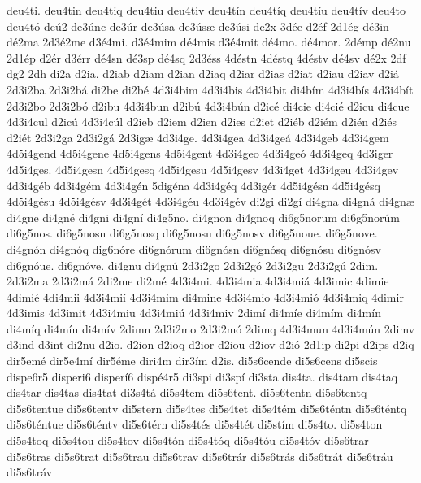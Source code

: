 {deu4ti.
deu4tin
deu4tiq
deu4tiu
deu4tiv
deu4t^^edn
deu4t^^edq
deu4t^^edu
deu4t^^edv
deu4to
deu4t^^f3
de^^fa2
de3^^fanc
de3^^far
de3^^fasa
de3^^fas^^e6
de3^^fasi
de2x
3d^^e9e
d2^^e9f
2d1^^e9g
d^^e93in
d^^e92ma
2d3^^e92me
d3^^e94mi.
d3^^e94mim
d^^e94mis
d3^^e94mit
d^^e94mo.
d^^e94mor.
2d^^e9mp
d^^e92nu
2d1^^e9p
d2^^e9r
d3^^e9rr
d^^e94sn
d^^e93sp
d^^e94sq
2d3^^e9ss
4d^^e9stn
4d^^e9stq
4d^^e9stv
d^^e94sv
d^^e92x
2df
dg2
2dh
di2a
d2ia.
d2iab
d2iam
d2ian
d2iaq
d2iar
d2ias
d2iat
d2iau
d2iav
d2i^^e1
2d3i2ba
2d3i2b^^e1
di2be
di2b^^e9
4d3i4bim
4d3i4bis
4d3i4bit
di4b^^edm
4d3i4b^^eds
4d3i4b^^edt
2d3i2bo
2d3i2b^^f3
d2ibu
4d3i4bun
d2ib^^fa
4d3i4b^^fan
d2ic^^e9
di4cie
di4ci^^e9
d2icu
di4cue
4d3i4cul
d2ic^^fa
4d3i4c^^fal
d2ieb
d2iem
d2ien
d2ies
d2iet
d2i^^e9b
d2i^^e9m
d2i^^e9n
d2i^^e9s
d2i^^e9t
2d3i2ga
2d3i2g^^e1
2d3ig^^e6
4d3i4ge.
4d3i4gea
4d3i4ge^^e1
4d3i4geb
4d3i4gem
4d5i4gend
4d5i4gene
4d5i4gens
4d5i4gent
4d3i4geo
4d3i4ge^^f3
4d3i4geq
4d3iger
4d5i4ges.
4d5i4gesn
4d5i4gesq
4d5i4gesu
4d5i4gesv
4d3i4get
4d3i4geu
4d3i4gev
4d3i4g^^e9b
4d3i4g^^e9m
4d3i4g^^e9n
5dig^^e9na
4d3i4g^^e9q
4d3ig^^e9r
4d5i4g^^e9sn
4d5i4g^^e9sq
4d5i4g^^e9su
4d5i4g^^e9sv
4d3i4g^^e9t
4d3i4g^^e9u
4d3i4g^^e9v
di2gi
di2g^^ed
di4gna
di4gn^^e1
di4gn^^e6
di4gne
di4gn^^e9
di4gni
di4gn^^ed
di4g5no.
di4gnon
di4gnoq
di6g5norum
di6g5nor^^fam
di6g5nos.
di6g5nosn
di6g5nosq
di6g5nosu
di6g5nosv
di6g5noue.
di6g5nove.
di4gn^^f3n
di4gn^^f3q
dig6n^^f3re
di6gn^^f3rum
di6gn^^f3sn
di6gn^^f3sq
di6gn^^f3su
di6gn^^f3sv
di6gn^^f3ue.
di6gn^^f3ve.
di4gnu
di4gn^^fa
2d3i2go
2d3i2g^^f3
2d3i2gu
2d3i2g^^fa
2dim.
2d3i2ma
2d3i2m^^e1
2di2me
di2m^^e9
4d3i4mi.
4d3i4mia
4d3i4mi^^e1
4d3imic
4dimie
4dimi^^e9
4di4mii
4d3i4mi^^ed
4d3i4mim
di4mine
4d3i4mio
4d3i4mi^^f3
4d3i4miq
4dimir
4d3imis
4d3imit
4d3i4miu
4d3i4mi^^fa
4d3i4miv
2dim^^ed
di4m^^ede
di4m^^edm
di4m^^edn
di4m^^edq
di4m^^edu
di4m^^edv
2dimn
2d3i2mo
2d3i2m^^f3
2dimq
4d3i4mun
4d3i4m^^fan
2dimv
d3ind
d3int
di2nu
d2io.
d2ion
d2ioq
d2ior
d2iou
d2iov
d2i^^f3
2d1ip
di2pi
d2ips
d2iq
dir5em^^e9
dir5e4m^^ed
dir5^^e9me
diri4m
dir3^^edm
d2is.
di5s6cende
di5s6cens
di5scis
dispe6r5
disperi6
disper^^ed6
disp^^e94r5
di3spi
di3sp^^ed
di3sta
dis4ta.
dis4tam
dis4taq
dis4tar
dis4tas
dis4tat
di3s4t^^e1
di5s4tem
di5s6tent.
di5s6tentn
di5s6tentq
di5s6tentue
di5s6tentv
di5stern
di5s4tes
di5s4tet
di5s4t^^e9m
di5s6t^^e9ntn
di5s6t^^e9ntq
di5s6t^^e9ntue
di5s6t^^e9ntv
di5s6t^^e9rn
di5s4t^^e9s
di5s4t^^e9t
di5st^^edm
di5s4to.
di5s4ton
di5s4toq
di5s4tou
di5s4tov
di5s4t^^f3n
di5s4t^^f3q
di5s4t^^f3u
di5s4t^^f3v
di5s6trar
di5s6tras
di5s6trat
di5s6trau
di5s6trav
di5s6tr^^e1r
di5s6tr^^e1s
di5s6tr^^e1t
di5s6tr^^e1u
di5s6tr^^e1v
}
